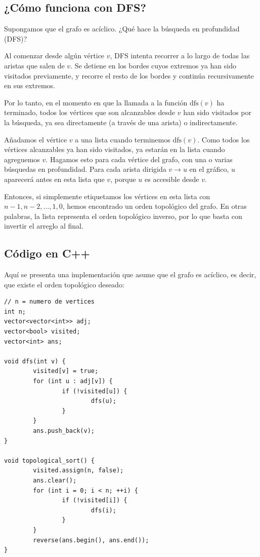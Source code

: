 \subsection*{¿Cómo funciona con DFS?}

Supongamos que el grafo es acíclico. ¿Qué hace la búsqueda en profundidad (DFS)?

Al comenzar desde algún vértice $v$, DFS intenta recorrer a lo largo de todas las aristas que salen de $v$. Se detiene en los bordes cuyos extremos ya han sido visitados previamente, y recorre el resto de los bordes y continúa recursivamente en sus extremos.

Por lo tanto, en el momento en que la llamada a la función $\text{dfs}(v)$ ha terminado, todos los vértices que son alcanzables desde $v$ han sido visitados por la búsqueda, ya sea directamente (a través de una arista) o indirectamente.

Añadamos el vértice $v$ a una lista cuando terminemos $\text{dfs}(v)$. Como todos los vértices alcanzables ya han sido visitados, ya estarán en la lista cuando agreguemos $v$. Hagamos esto para cada vértice del grafo, con una o varias búsquedas en profundidad. Para cada arista dirigida $v \rightarrow u$ en el gráfico, $u$ aparecerá antes en esta lista que $v$, porque $u$ es accesible desde $v$. 

Entonces, si simplemente etiquetamos los vértices en esta lista con $n-1, n-2, \dots, 1, 0$, hemos encontrado un orden topológico del grafo. En otras palabras, la lista representa el orden topológico inverso, por lo que basta con invertir el arreglo al final.

\subsection*{Código en C++}

Aquí se presenta una implementación que asume que el grafo es acíclico, es decir, que existe el orden topológico deseado:

\begin{lstlisting}[caption=Orden Topológico con DFS]
// n = numero de vertices
int n; 
vector<vector<int>> adj; 
vector<bool> visited;
vector<int> ans;

void dfs(int v) {
        visited[v] = true;
        for (int u : adj[v]) {
                if (!visited[u]) {
                        dfs(u);
                }
        }
        ans.push_back(v);
}

void topological_sort() {
        visited.assign(n, false);
        ans.clear();
        for (int i = 0; i < n; ++i) {
                if (!visited[i]) {
                        dfs(i);
                }
        }
        reverse(ans.begin(), ans.end());
}
\end{lstlisting}

